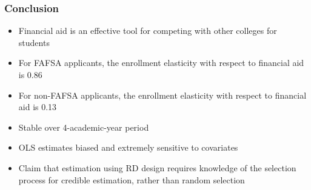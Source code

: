 \documentclass{beamer}
\begin{document}
\begin{frame}
\frametitle{Conclusion}
\begin{itemize}
	\item Financial aid is an effective tool for competing with other colleges for students
	\item For FAFSA applicants, the enrollment elasticity with respect to financial aid is 0.86
	\item For non-FAFSA applicants, the enrollment elasticity with respect to financial aid is 0.13
	\item Stable over 4-academic-year period
	\item OLS estimates biased and extremely sensitive to covariates
	\item Claim that estimation using RD design requires knowledge of the selection process for credible estimation, rather than random selection
\end{itemize}
\end{frame}



\iffalse
	\begin{columns}
		\column{0.5\textwidth}
		\centering
		\column{0.5\textwidth}
		\centering
	\end{columns}
\fi
\end{document}
